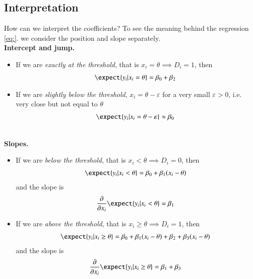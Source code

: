         \subsection{Interpretation}
            How can we interpret the coefficients? To see the meaning behind the regression \eqref{eq:}. we consider the position and slope separately.\\
            
            \noindent\textbf{Intercept and jump.}
            \begin{itemize}
                \item If we are \textit{exactly at the threshold}, that is $x_i = \theta \implies D_i = 1$, then
                \begin{align}
                    \expect{y_i | x_i = \theta} = \beta_0 + \beta_2
                \end{align}
                
                \item If we are \textit{slightly below the threshold}, $x_i = \theta -\varepsilon$ for a very small $\varepsilon>0$, i.e. very close but not equal to $\theta$
                \begin{align}
                    \expect{y_i\lvert x_i = \theta - \varepsilon} \approx \beta_0
                \end{align}
            \end{itemize}\\

            \noindent\textbf{Slopes.}
            \begin{itemize}
                \item If we are \textit{below the threshold}, that is $x_i < \theta\implies D_i=0$, then
                \begin{align}
                    \expect{y_i | x_i < \theta} = \beta_0 + \beta_1 (x_i-\theta)
                \end{align}
                and the slope is
                \begin{align}
                    \pdv*{\expect{y_i|x_i<\theta}}{x_i}= \beta_1
                \end{align}

                \item If we are \textit{above the threshold}, that is $x_i\geq \theta\implies D_i = 1$, then
                \begin{align}
                    \expect{y_i | x_i \geq\theta} = \beta_0 + \beta_1 (x_i-\theta) + \beta_2 + \beta_3 (x_i-\theta)
                \end{align}
                and the slope is
                \begin{align}
                    \pdv*{\expect{y_i|x_i\geq\theta}}{x_i}= \beta_1 + \beta_3
                \end{align}
            \end{itemize}


